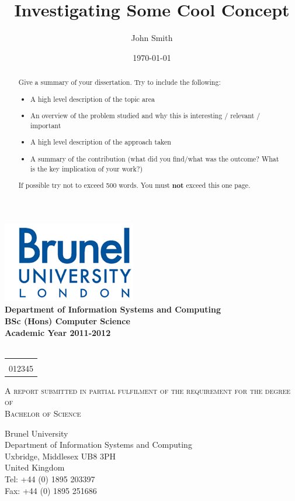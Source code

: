\documentclass[final,a4paper,11pt]{report}
\title{Investigating Some Cool Concept}	\let\Title\@title %
\author{John Smith}	\let\Author\@author %
\date{\today}	\let\Date\@date
\newcommand{\StudentID}{012345} %
\begin{document}

\begin{titlepage}
\begin{center}
\includegraphics[scale=0.75]{brunel_logo}\\[1cm]
\textbf{
\large{
Department of Information Systems and Computing\\[0.5cm]
BSc (Hons) Computer Science
}\\[0.5cm]
\normalsize Academic Year 2011-2012
}\\[2.5cm]
{\LARGE \Title}\\[0.75cm]

\begin{tabular}{@{} l}\\
{\Large \Author} \\[0.5cm]
{\Large \StudentID}
\end{tabular}

\vfill
\textsc{
A report submitted in partial fulfilment of the requirement for the degree of \\
Bachelor of Science
}\\[1.5cm]
\end{center}

\begin{flushright}
\small{
Brunel University\\
Department of Information Systems and Computing\\
Uxbridge, Middlesex UB8 3PH\\
United Kingdom\\
Tel: +44 (0) 1895 203397\\
Fax: +44 (0) 1895 251686\\
}
\end{flushright}
\end{titlepage}

\clearpage



\begin{abstract}
\thispagestyle{other}
Give a summary of your dissertation. Try to include the following:
\begin{itemize}
\item A high level description of the topic area 
\item An overview of the problem studied and why this is interesting / relevant / important
\item A high level description of the approach taken
\item A summary of the contribution (what did you find/what was the outcome? What is the key implication of your work?)
\end{itemize}
If possible try not to exceed 500 words. You must \textbf{not} exceed this one page.


\end{abstract}
\end{document}
